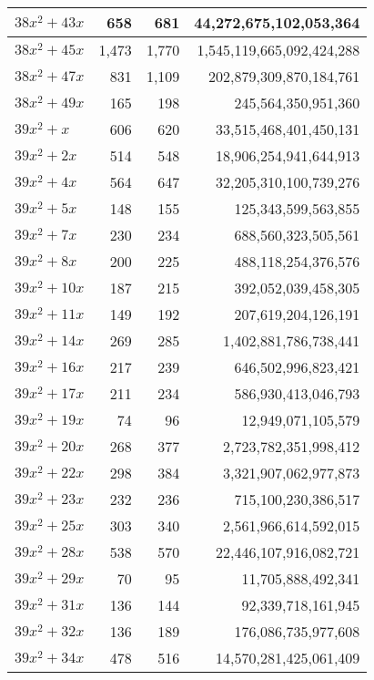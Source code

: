 \documentclass[a4paper]{amsproc}
\theoremstyle{plain}
\theoremstyle{named}
\begin{document}
\begin{longtable}{ | l | r | r | r | }
$38x^2 + 43x$ & 658 & 681 & 44{,}272{,}675{,}102{,}053{,}364 \\ \hline
$38x^2 + 45x$ & 1{,}473 & 1{,}770 & 1{,}545{,}119{,}665{,}092{,}424{,}288 \\ \hline
$38x^2 + 47x$ & 831 & 1{,}109 & 202{,}879{,}309{,}870{,}184{,}761 \\ \hline
$38x^2 + 49x$ & 165 & 198 & 245{,}564{,}350{,}951{,}360 \\ \hline
$39x^2 + x$ & 606 & 620 & 33{,}515{,}468{,}401{,}450{,}131 \\ \hline
$39x^2 + 2x$ & 514 & 548 & 18{,}906{,}254{,}941{,}644{,}913 \\ \hline
$39x^2 + 4x$ & 564 & 647 & 32{,}205{,}310{,}100{,}739{,}276 \\ \hline
$39x^2 + 5x$ & 148 & 155 & 125{,}343{,}599{,}563{,}855 \\ \hline
$39x^2 + 7x$ & 230 & 234 & 688{,}560{,}323{,}505{,}561 \\ \hline
$39x^2 + 8x$ & 200 & 225 & 488{,}118{,}254{,}376{,}576 \\ \hline
$39x^2 + 10x$ & 187 & 215 & 392{,}052{,}039{,}458{,}305 \\ \hline
$39x^2 + 11x$ & 149 & 192 & 207{,}619{,}204{,}126{,}191 \\ \hline
$39x^2 + 14x$ & 269 & 285 & 1{,}402{,}881{,}786{,}738{,}441 \\ \hline
$39x^2 + 16x$ & 217 & 239 & 646{,}502{,}996{,}823{,}421 \\ \hline
$39x^2 + 17x$ & 211 & 234 & 586{,}930{,}413{,}046{,}793 \\ \hline
$39x^2 + 19x$ & 74 & 96 & 12{,}949{,}071{,}105{,}579 \\ \hline
$39x^2 + 20x$ & 268 & 377 & 2{,}723{,}782{,}351{,}998{,}412 \\ \hline
$39x^2 + 22x$ & 298 & 384 & 3{,}321{,}907{,}062{,}977{,}873 \\ \hline
$39x^2 + 23x$ & 232 & 236 & 715{,}100{,}230{,}386{,}517 \\ \hline
$39x^2 + 25x$ & 303 & 340 & 2{,}561{,}966{,}614{,}592{,}015 \\ \hline
$39x^2 + 28x$ & 538 & 570 & 22{,}446{,}107{,}916{,}082{,}721 \\ \hline
$39x^2 + 29x$ & 70 & 95 & 11{,}705{,}888{,}492{,}341 \\ \hline
$39x^2 + 31x$ & 136 & 144 & 92{,}339{,}718{,}161{,}945 \\ \hline
$39x^2 + 32x$ & 136 & 189 & 176{,}086{,}735{,}977{,}608 \\ \hline
$39x^2 + 34x$ & 478 & 516 & 14{,}570{,}281{,}425{,}061{,}409 \\ \hline

\end{longtable}
\end{document}

